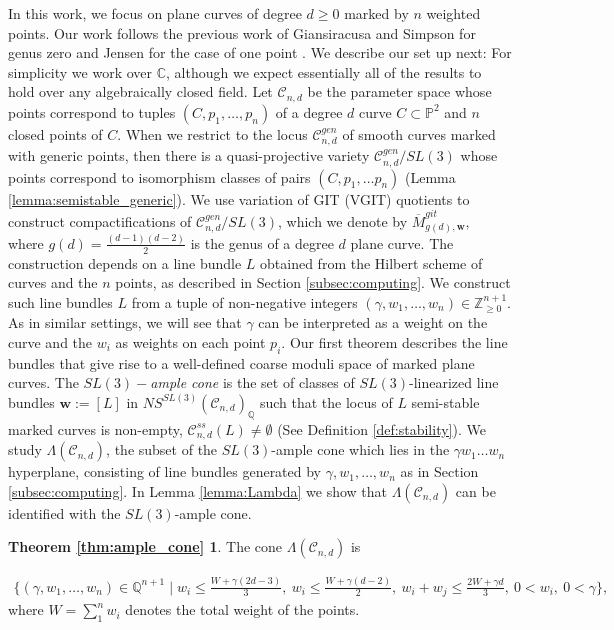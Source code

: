 \documentclass{amsart}
\newcommand{\Q}{\mathbb{Q}}
\newcommand{\C}{\mathbb{C}}
\newcommand{\Pj}{\mathbb{P}}
\newcommand{\mc}{\mathcal}
\numberwithin{equation}{section}
\theoremstyle{definition}
\begin{document}
In this work, we focus on plane curves of degree $d \geq 0$ marked by $n$ weighted points. Our work follows the previous work of Giansiracusa and Simpson for genus zero \cite{Giansiracusa_2010} and Jensen for the case of one point \cite{Jen13}. 
We describe our set up next: For simplicity we work over $\C$, although we expect essentially all of the results to hold over any algebraically closed field. Let  $\mc{C}_{n,d}$ be the parameter space whose points correspond to tuples $(C, p_1, \dots , p_n)$ of a degree $d$ curve $C \subset \Pj^2$ and $n$ closed points of $C$. When we restrict to the locus $\mc{C}_{n,d}^{gen}$ of smooth curves marked with generic points, then there is a quasi-projective variety $\mc{C}_{n,d}^{gen} \slash SL(3)$ whose points correspond to isomorphism classes of pairs $(C, p_1, \ldots p_n)$ (Lemma \ref{lemma:semistable_generic}). We use variation of GIT (VGIT) quotients to construct compactifications of $\mc{C}_{n,d}^{gen} \slash SL(3)$, which we denote by $\overline{M}_{g(d), \mathbf{w}}^{git},$ where $g(d) = \frac{(d-1)(d-2)}{2}$ is the genus of a degree $d$ plane curve. The construction depends on a line bundle $L$ obtained from the Hilbert scheme of curves and the $n$ points, as described in Section \ref{subsec:computing}. 
We construct such line bundles $L$ from a tuple of non-negative integers $(\gamma, w_1, \dots, w_n) \in \mathbb{Z}^{n+1}_{\geq 0}$. As in similar settings, we will see that $\gamma$ can be interpreted as a weight on the curve and the $w_i$ as weights on each point $p_i$. Our first theorem describes the line bundles that give rise to a well-defined coarse moduli space of marked plane curves. The \textit{$SL(3)-$ample cone} is the set of classes of $SL(3)$-linearized line bundles $\mathbf{w} := [L]$ in $NS^{SL(3)}(\mc{C}_{n,d})_\Q$ such that the locus of $L$ semi-stable marked curves is non-empty, $\mc{C}_{n,d}^{ss}(L) \neq \emptyset$  (See Definition \ref{def:stability}). We study $\Lambda(\mc{C}_{n,d})$, the subset of the $SL(3)$-ample cone which lies in the $\gamma w_1 \dots  w_n$ hyperplane, consisting of line bundles generated by $\gamma, w_1, \dots , w_n$ as in Section \ref{subsec:computing}. In Lemma \ref{lemma:Lambda} we show that $\Lambda(\mc{C}_{n,d})$ can be identified with the $SL(3)$-ample cone.

\newtheorem*{thm:ample_cone}{Theorem \ref{thm:ample_cone}}
\begin{thm:ample_cone}
  The cone $\Lambda(\mc{C}_{n,d})$ is 

\begin{align*}
 \bigg\{
(\gamma, w_1, \ldots, w_n) \in \Q^{n+1}
\; \bigg| \;
   w_i \leq \frac{W+\gamma(2d-3)}{3} , \ w_i \leq \frac{W+ \gamma(d-2)}{2}, \ w_i+w_j \leq \frac{2W+ \gamma d}{3}, \ 
   0 < w_i, \ 0 < \gamma
 \bigg\},
\end{align*}
where $W = \sum_1^n w_i$ denotes the total weight of the points.
\end{thm:ample_cone}
\end{document}

